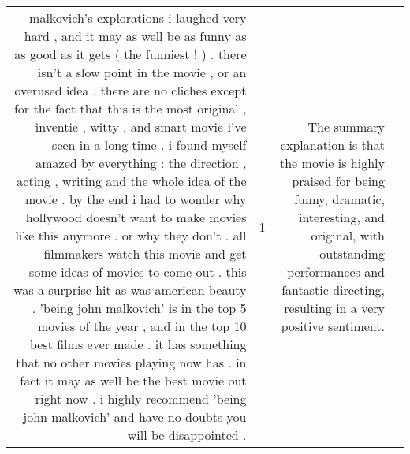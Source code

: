 \begin{tabular}{r{1cm} p{0.4in} r{1cm} p{0.4in}}
malkovich's explorations i laughed very hard , and it may as well be as funny as as good as it gets ( the funniest ! ) .  there isn't a slow point in the movie , or an overused idea .  there are no cliches except for the fact that this is the most original , inventie , witty , and smart movie i've seen in a long time .  i found myself amazed by everything : the direction , acting , writing and the whole idea of the movie .  by the end i had to wonder why hollywood doesn't want to make movies like this anymore .  or why they don't .  all filmmakers watch this movie and get some ideas of movies to come out .  this was a surprise hit as was american beauty .  'being john malkovich' is in the top 5 movies of the year , and in the top 10 best films ever made .  it has something that no other movies playing now has .  in fact it may as well be the best movie out right now .  i highly recommend 'being john malkovich' and have no doubts you will be disappointed .   & 1 & The summary explanation is that the movie is highly praised for being funny, dramatic, interesting, and original, with outstanding performances and fantastic directing, resulting in a very positive sentiment. \\

\end{tabular}

